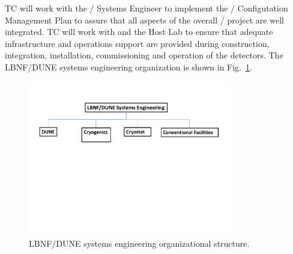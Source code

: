 TC will work with the / Systems Engineer to
implement the / Configutation Management Plan
to assure that all aspects of the overall /
project are well integrated. TC will work with  and the
Host Lab to ensure that adequate infrastructure and operations support
are provided during construction, integration, installation,
commissioning and operation of the detectors. The LBNF/DUNE systems
engineering organization is shown in Fig.~\ref{fig:DUNE_SE_org}.
\begin{figure}[htb]
  \begin{center}
    \includegraphics[width=0.8\textwidth]{far-detector-generic/figures/TC_SE_Org_Chart}
    \caption{LBNF/DUNE systems engineering organizational structure.}
    \label{fig:DUNE_SE_org}
  \end{center}
\end{figure}



